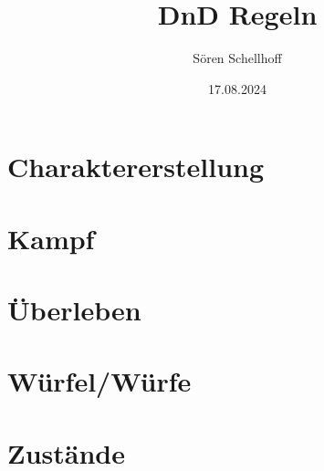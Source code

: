 \documentclass{book}
\title{DnD Regeln}
\author{Sören Schellhoff}
\date{17.08.2024}
\newcommand{\chapterfile}[2]{\chapter{#1} }
\begin{document}
\maketitle

\tableofcontents

\chapterfile{Charaktererstellung}{charactercreation}

\chapterfile{Kampf}{fight}

\chapterfile{Überleben}{survival}

\chapterfile{Würfel/Würfe}{dice}

\chapterfile{Zustände}{conditions}
\end{document}
